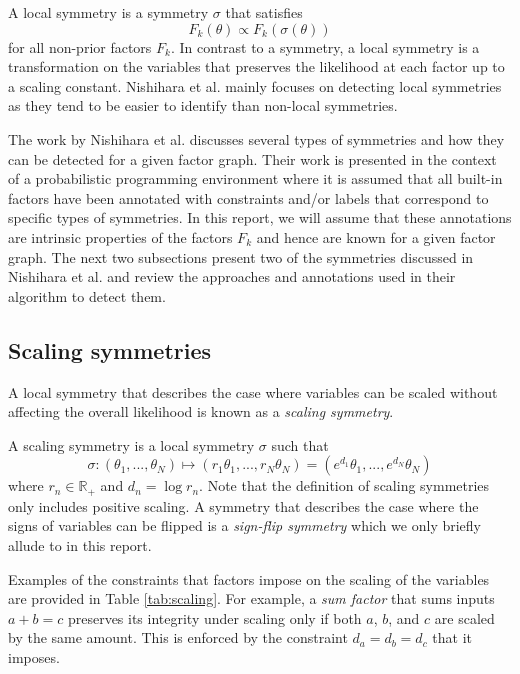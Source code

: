\begin{defn}
A local symmetry is a symmetry $\sigma$ that satisfies
\[
F_k(\theta) \propto F_k\left(\sigma(\theta)\right)
\]
for all non-prior factors $F_k$. In contrast to a symmetry, a local symmetry is a transformation on the variables that preserves the likelihood at each factor up to a scaling constant. Nishihara et al. mainly focuses on detecting local symmetries as they tend to be easier to identify than non-local symmetries.
\end{defn}

The work by Nishihara et al. discusses several types of symmetries and how they can be detected for a given factor graph. Their work is presented in the context of a probabilistic programming environment where it is assumed that all built-in factors have been annotated with constraints and/or labels that correspond to specific types of symmetries. In this report, we will assume that these annotations are intrinsic properties of the factors $F_k$ and hence are known for a given factor graph. The next two subsections present two of the symmetries discussed in Nishihara et al. and review the approaches and annotations used in their algorithm to detect them.


\subsection{Scaling symmetries} \label{sec:scaling}

A local symmetry that describes the case where variables can be scaled without affecting the overall likelihood is known as a \textit{scaling symmetry}.
\begin{defn}
A scaling symmetry is a local symmetry $\sigma$ such that
\[
\sigma: (\theta_1,...,\theta_N) \longmapsto (r_1\theta_1,...,r_N\theta_N) = (e^{d_1}\theta_1,...,e^{d_N}\theta_N)
\]
where $r_n\in\mathbb{R}_+$ and $d_n=\log r_n$. Note that the definition of scaling symmetries only includes positive scaling. A symmetry that describes the case where the signs of variables can be flipped is a \textit{sign-flip symmetry} which we only briefly allude to in this report.
\end{defn}
Examples of the constraints that factors impose on the scaling of the variables are provided in Table \ref{tab:scaling}. For example, a \textit{sum factor} that sums inputs $a+b=c$ preserves its integrity under scaling only if both $a$, $b$, and $c$ are scaled by the same amount. This is enforced by the constraint $d_a=d_b=d_c$ that it imposes.

